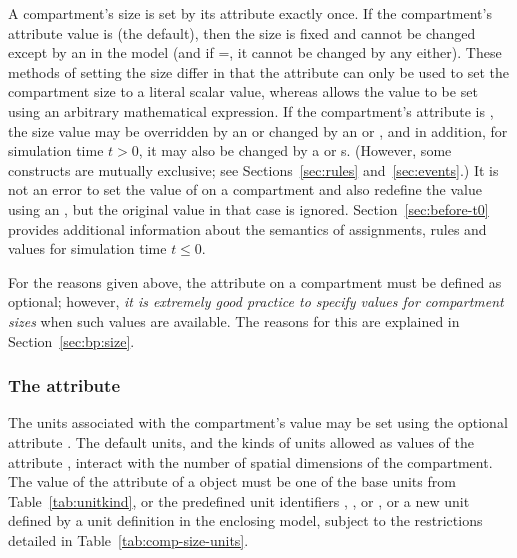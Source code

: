 A compartment's size is set by its 
attribute exactly once.  If the compartment's
 attribute value is  (the
default), then the size is fixed and cannot be changed except by
an \InitialAssignment in the model (and if
=, it cannot be changed by any
\InitialAssignment either).  These methods of setting the size
differ in that the  attribute can only be used to set
the compartment size to a literal scalar value, whereas
\InitialAssignment allows the value to be set using an arbitrary
mathematical expression.  If the compartment's 
attribute is , the size value may be overridden by an
\InitialAssignment or changed by an \AssignmentRule or
\AlgebraicRule, and in addition, for simulation time $t > 0$, it
may also be changed by a \RateRule or \Event{}s.  (However, some
constructs are mutually exclusive; see Sections~\ref{sec:rules}
and~\ref{sec:events}.)  It is not an error to set the value of 
on a compartment and also redefine the value using an
\InitialAssignment, but the original  value in that case is
ignored.  Section~\ref{sec:before-t0} provides additional
information about the semantics of assignments, rules and values
for simulation time $t \leq 0$.

For the reasons given above, the  attribute on a
compartment must be defined as optional; however, \emph{it is
  extremely good practice to specify values for compartment sizes}
when such values are available. The reasons for this are explained
in Section~\ref{sec:bp:size}.


\subsubsection{The  attribute}
\label{sec:compartment-units}

The units associated with the compartment's  value may
be set using the optional attribute .  The default units,
and the kinds of units allowed as values of the attribute
, interact with the number of spatial dimensions of
the compartment.  The value of the  attribute of a
\Compartment object must be one of the base units from
Table~\ref{tab:unitkind}, or the predefined unit identifiers ,
,  or , or a new unit
defined by a unit definition in the enclosing model, subject to
the restrictions detailed in Table~\ref{tab:comp-size-units}.

